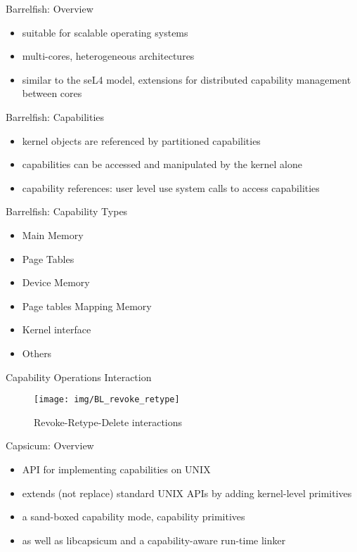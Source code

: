 \documentclass[11pt]{beamer}
\begin{document}
\begin{frame}{Barrelfish: Overview}
	\begin{itemize}
	\item suitable for scalable operating systems 
	\item multi-cores, heterogeneous architectures
	\item similar to the seL4 model, extensions for distributed capability management between cores
	\end{itemize}
\end{frame}


\begin{frame}{Barrelfish: Capabilities}
	\begin{itemize}
	\item kernel objects are referenced by partitioned capabilities
	\item capabilities can be accessed and manipulated by the kernel alone
	\item capability references: user level use system calls to access capabilities
	\end{itemize}
\end{frame}

\begin{frame}{Barrelfish: Capability Types}
\begin{itemize}
\item Main Memory
\item Page Tables 
\item Device Memory
\item Page tables Mapping Memory 
\item Kernel interface
\item Others
\end{itemize}
\end{frame}


\begin{frame}{Capability Operations Interaction}
\begin{figure}
		  \texttt{[image: img/BL\_revoke\_retype]}
		  \caption{Revoke-Retype-Delete interactions}
		  
    \end{figure}   
\end{frame}

\begin{frame}{Capsicum: Overview}
	\begin{itemize}
	\item API for implementing capabilities on UNIX 
	\item extends (not replace) standard UNIX APIs by adding kernel-level primitives
	\item a sand-boxed capability mode, capability primitives 
	\item as well as libcapsicum and a capability-aware run-time linker
	\end{itemize}
\end{frame}
\end{document}

